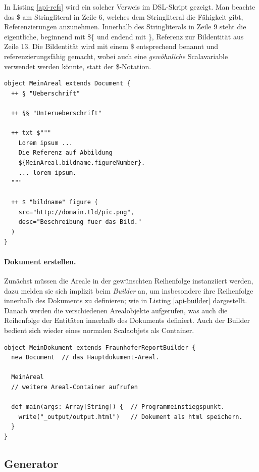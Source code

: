 In Listing \ref{api-refs} wird ein solcher Verweis im DSL-Skript gezeigt.
Man beachte das \$ am Stringliteral in Zeile 6, welches dem Stringliteral
die Fähigkeit gibt, Referenzierungen anzunehmen. Innerhalb des
Stringliterals in Zeile 9 steht die eigentliche, beginnend mit \$\{
und endend mit \}, Referenz zur Bildentität aus Zeile 13.
Die Bildentität wird mit einem \$ entsprechend benannt und
referenzierungsfähig gemacht, wobei auch eine \emph{gewöhnliche}
Scalavariable verwendet werden könnte, statt der \$-Notation.

\begin{lstlisting}[label=api-refs,caption=Referenzierungen im DSL-Skript.]
object MeinAreal extends Document {
  ++ § "Ueberschrift"

  ++ §§ "Unterueberschrift"

  ++ txt $"""
    Lorem ipsum ...
    Die Referenz auf Abbildung
    ${MeinAreal.bildname.figureNumber}.
    ... lorem ipsum.
  """

  ++ $ "bildname" figure (
    src="http://domain.tld/pic.png",
    desc="Beschreibung fuer das Bild."
  )
}
\end{lstlisting}

\paragraph{Dokument erstellen.} Zunächst müssen die Areale in der gewünschten
Reihenfolge instanziiert werden, dazu melden sie sich implizit beim
\emph{Builder} an, um insbesondere ihre Reihenfolge innerhalb des Dokuments zu
definieren; wie in Listing \ref{api-builder} dargestellt.
Danach werden die verschiedenen Arealobjekte
aufgerufen, was auch die Reihenfolge der Entitäten innerhalb des Dokuments
definiert.
Auch der Builder bedient sich wieder eines normalen Scalaobjets als Container.

\begin{lstlisting}[label=api-builder,caption=Dokument erstellen.]
object MeinDokument extends FraunhoferReportBuilder {
  new Document  // das Hauptdokument-Areal.

  MeinAreal
  // weitere Areal-Container aufrufen

  def main(args: Array[String]) {  // Programmeinstiegspunkt.
    write("_output/output.html")   // Dokument als html speichern.
  }
}
\end{lstlisting}


\subsection{Generator}\label{sec-archi-generator}

